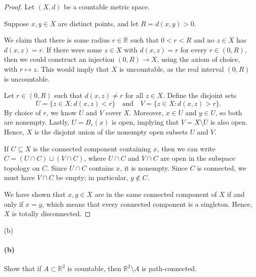 \documentclass[12pt]{article}
\newlength{\myparskip}
\newenvironment{fullbox}{\begin{lrbox}{\savefullbox}\begin{minipage}{\dimexpr\textwidth-2\fboxsep\relax}\setlength{\parskip}{\myparskip}}{\end{minipage}\end{lrbox}\framebox[\textwidth]{\usebox{\savefullbox}}}
\newenvironment{pbox}[1][]{\begin{fullbox}\ifx#1\empty\else\paragraph{#1}\fi}{\end{fullbox}}
\newcommand{\isp}[1]{\quad\text{#1}\quad}
\newcommand{\R}{\mathbb{R}}
\newcommand{\<}{\langle}
\renewcommand{\>}{\rangle}
\newcommand{\clo}{\overline}
\begin{document}
\begin{proof}
    Let $(X, d)$ be a countable metric space.

    Suppose $x, y \in X$ are distinct points, and let $R = d(x, y) > 0$.
    
    We claim that there is some radius $r \in \R$ such that $0 < r < R$ and no $z \in X$ has $d(x, z) = r$. If there were some $z \in X$ with $d(x, z) = r$ for every $r \in (0, R)$, then we could construct an injection $(0, R) \to X$, using the axiom of choice, with $r \mapsto z$. This would imply that $X$ is uncountable, as the real interval $(0, R)$ is uncountable.

    Let $r \in (0, R)$ such that $d(x, z) \ne r$ for all $z \in X$. Define the disjoint sets
    \[
        U = \{z \in X : d(x, z) < r\}
        \isp{and}
        V = \{z \in X : d(x, z) > r\}.
    \]
    By choice of $r$, we know $U$ and $V$ cover $X$. Moreover, $x \in U$ and $y \in U$, so both are nonempty. Lastly, $U = B_r(x)$ is open, implying that $V = X \setminus \clo{U}$ is also open. Hence, $X$ is the disjoint union of the nonempty open subsets $U$ and $V$.

    If $C \subseteq X$ is the connected component containing $x$, then we can write $C = (U \cap C) \sqcup (V \cap C)$, where $U \cap C$ and $V \cap C$ are open in the subspace topology on $C$. Since $U \cap C$ contains $x$, it is nonempty. Since $C$ is connected, we must have $V \cap C$ be empty; in particular, $y \notin C$.

    We have shown that $x, y \in X$ are in the same connected component of $X$ if and only if $x = y$, which means that every connected component is a singleton. Hence, $X$ is totally disconnected.

\end{proof}

\begin{pbox}[(b)]
    Show that if $A \subset \mathbb R^2$ is countable, then $\mathbb R^2 \setminus A$ is path-connected.
\end{pbox}
\end{document}
